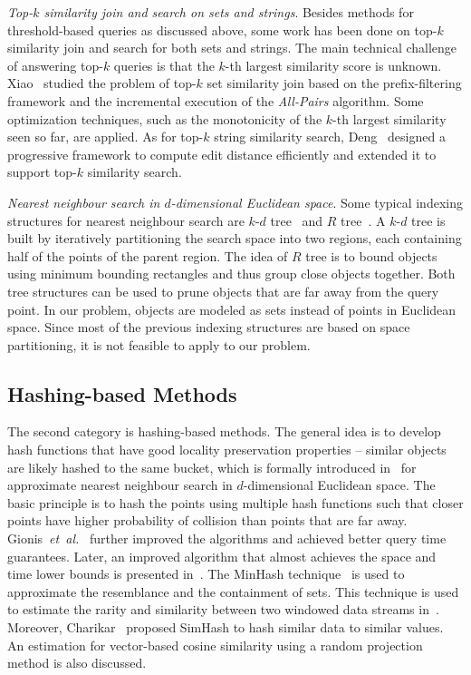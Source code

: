 \emph{Top-$k$ similarity join and search on sets and strings}. Besides methods for threshold-based queries as discussed above, some work has been done on top-$k$ similarity join and search for both sets and strings. The main technical challenge of answering top-$k$ queries is that the $k$-th largest similarity score is unknown.  Xiao~\cite{XiaoWLS09} studied the problem of top-$k$ set similarity join based on the prefix-filtering framework and the incremental execution of the \emph{All-Pairs} algorithm. Some optimization techniques, such as the monotonicity of the $k$-th largest similarity seen so far, are applied.  As for top-$k$ string similarity search, Deng~\cite{DengLFL13} designed a progressive framework to compute edit distance efficiently and extended it to support top-$k$ similarity search.

\emph{Nearest neighbour search in $d$-dimensional Euclidean space}. Some typical indexing structures for nearest neighbour search are $k\text{-}d$ tree~\cite{DBLP:journals/cacm/Bentley75} and $R$ tree~\cite{DBLP:conf/sigmod/Guttman84}. A $k\text{-}d$ tree is built by iteratively partitioning the search space into two regions, each containing half of the points of the parent region. The idea of $R$ tree is to bound objects using minimum bounding rectangles and thus group close objects together. Both tree structures can be used to prune objects that are far away from the query point. In our problem, objects are modeled as sets instead of points in Euclidean space. Since most of the previous indexing structures are based on space partitioning, it is not feasible to apply to our problem.



\subsection{Hashing-based Methods}
The second category is hashing-based methods. The general idea is to develop hash functions that have good locality preservation properties -- similar objects are likely hashed to the same bucket, which is formally introduced in~\cite{IndykM98} for approximate nearest neighbour search in $d$-dimensional Euclidean space. The basic principle is to hash the points using multiple hash functions such that closer points have higher probability of collision than points that are far away. Gionis~\textit{et~al.}~\cite{GIR99} further improved the algorithms and achieved better query time guarantees. Later, an improved algorithm that almost achieves the space and time lower bounds is presented in~\cite{AndoniI06}. The MinHash technique~\cite{Broder97} is used to approximate the resemblance and the containment of sets. This technique is used to estimate the rarity and similarity between two windowed data streams in~\cite{DatarM02}. Moreover, Charikar~\cite{C02} proposed SimHash to hash similar data to similar values. An estimation for vector-based cosine similarity using a random projection method is also discussed.    

